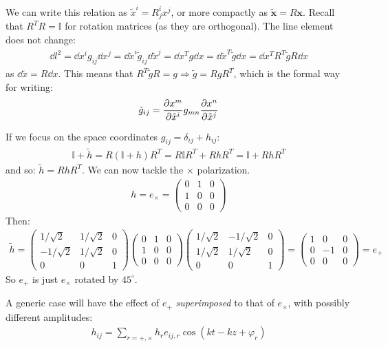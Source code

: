 \documentclass[../template.tex]{subfiles}
\begin{document}
We can write this relation as $\tilde{x}^i = R^i_j x^j$, or more compactly as $\bm{\tilde{x}} = R \bm{x}$. Recall that $R^T R = \mathbb{I}$ for rotation matrices (as they are orthogonal). The line element does not change:
\begin{align*}
    \dd{l^2} = \dd{x^i} g_{ij} \dd{x^j} = \dd{\tilde{x}^i} \tilde{g}_{ij} \dd{\tilde{x}^j} = \dd{x^T} g \dd{x} = \dd{\tilde{x}^T} \tilde{g} \dd{x} = \dd{x^T} R^T \tilde{g} R \dd{x}
\end{align*}
as $\dd{\tilde{x}} = R \dd{x}$. This means that $R^T \tilde{g} R = g \Rightarrow \tilde{g} = R g R^T$, which is the formal way for writing:
\begin{align*}
    \tilde{g}_{ij} = \pdv{x^m}{\tilde{x}^i} g_{mn} \pdv{x^n}{\tilde{x}^j}
\end{align*}

If we focus on the space coordinates $g_{ij} = \delta_{ij} + h_{ij}$:
\begin{align*}
    \mathbb{I} + \tilde{h} = R(\mathbb{I} + h) R^T = R \mathbb{I}R^T + R h R^T = \mathbb{I} + R h R^T 
\end{align*}
and so: $\tilde{h} = R h R^T$. We can now tackle the $\times$ polarization. 
\begin{align*}
    h = e_\times = \left(\begin{array}{ccc}
    0 & 1 & 0 \\ 
    1 & 0 & 0 \\ 
    0 & 0 & 0
    \end{array}\right)
\end{align*}
Then:
\begin{align*}
    \tilde{h} = \left(\begin{array}{ccc}
        1/\sqrt{2} & 1/\sqrt{2} & 0 \\ 
        -1/\sqrt{2} & 1/\sqrt{2} & 0 \\ 
        0 & 0 & 1
        \end{array}\right) \left(\begin{array}{ccc}
        0 & 1 & 0 \\ 
        1 & 0 & 0 \\ 
        0 & 0 & 0
        \end{array}\right) \left(\begin{array}{ccc}
            1/\sqrt{2} & -1/\sqrt{2} & 0 \\ 
            1/\sqrt{2} & 1/\sqrt{2} & 0 \\ 
            0 & 0 & 1
            \end{array}\right) = \left(\begin{array}{ccc}
            1 & 0 & 0 \\ 
            0 & -1 & 0 \\ 
            0 & 0 & 0
            \end{array}\right) = e_+
\end{align*}
So $e_+$ is just $e_\times$ rotated by $45^\circ$.

A generic case will have the effect of $e_+$ \textit{superimposed} to that of $e_\times$, with possibly different amplitudes:
\begin{align*}
    h_{ij} = \sum_{r=+,\times} h_r e_{ij,r} \cos(kt - kz + \varphi_r)
\end{align*} 
\end{document}
